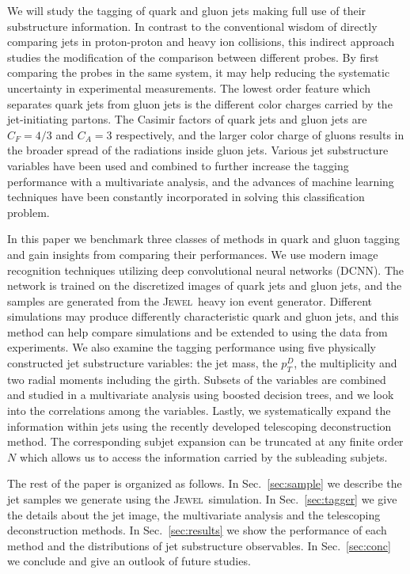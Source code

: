 \documentclass[notoc]{JHEP3}
\newcommand{\jw}{\textsc{Jewel}~}
\begin{document}
We will study the tagging of quark and gluon jets making full use of their substructure information. In contrast to the conventional wisdom of directly comparing jets in proton-proton and heavy ion collisions, this indirect approach studies the modification of the comparison between different probes. By first comparing the probes in the same system, it may help reducing the systematic uncertainty in experimental measurements. The lowest order feature which separates quark jets from gluon jets is the different color charges carried by the jet-initiating partons. The Casimir factors of quark jets and gluon jets are $C_F = 4/3$ and $C_A=3$ respectively, and the larger color charge of gluons results in the broader spread of the radiations inside gluon jets. Various jet substructure variables have been used and combined to further increase the tagging performance with a multivariate analysis, and the advances of machine learning techniques have been constantly incorporated in solving this classification problem.

In this paper we benchmark three classes of methods in quark and gluon tagging and gain insights from comparing their performances. We use modern image recognition techniques utilizing deep convolutional neural networks (DCNN). The network is trained on the discretized images of quark jets and gluon jets, and the samples are generated from the \jw heavy ion event generator. Different simulations may produce differently characteristic quark and gluon jets, and this method can help compare simulations and be extended to using the data from experiments. We also examine the tagging performance using five physically constructed jet substructure variables: the jet mass, the $p_T^D$, the multiplicity and two radial moments including the girth. Subsets of the variables are combined and studied in a multivariate analysis using boosted decision trees, and we look into the correlations among the variables. Lastly, we systematically expand the information within jets using the recently developed telescoping deconstruction method. The corresponding subjet expansion can be truncated at any finite order $N$ which allows us to access the information carried by the subleading subjets.

The rest of the paper is organized as follows. In Sec.~\ref{sec:sample} we describe the jet samples we generate using the \jw simulation. In Sec.~\ref{sec:tagger} we give the details about the jet image, the multivariate analysis and the telescoping deconstruction methods. In Sec.~\ref{sec:results} we show the performance of each method and the distributions of jet substructure observables. In Sec.~\ref{sec:conc} we conclude and give an outlook of future studies.
\end{document}
